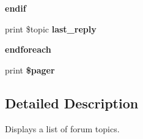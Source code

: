 \begin{DoxyCompactItemize}
\item 
\hypertarget{forum-topic-list_8tpl_8php_a82cd33ca97ff99f2fcc5e9c81d65251b}{
{\bfseries endif}}
\label{forum-topic-list_8tpl_8php_a82cd33ca97ff99f2fcc5e9c81d65251b}

\item 
\hypertarget{forum-topic-list_8tpl_8php_a146df04f10b09ef6f4f986b0ab1dafde}{
print \$topic {\bfseries last\_\-reply}}
\label{forum-topic-list_8tpl_8php_a146df04f10b09ef6f4f986b0ab1dafde}

\item 
\hypertarget{forum-topic-list_8tpl_8php_a672d9707ef91db026c210f98cc601123}{
{\bfseries endforeach}}
\label{forum-topic-list_8tpl_8php_a672d9707ef91db026c210f98cc601123}

\item 
\hypertarget{forum-topic-list_8tpl_8php_a832d48720a0d8c51e6a14792173c3a61}{
print {\bfseries \$pager}}
\label{forum-topic-list_8tpl_8php_a832d48720a0d8c51e6a14792173c3a61}

\end{DoxyCompactItemize}


\subsection{Detailed Description}
Displays a list of forum topics.

